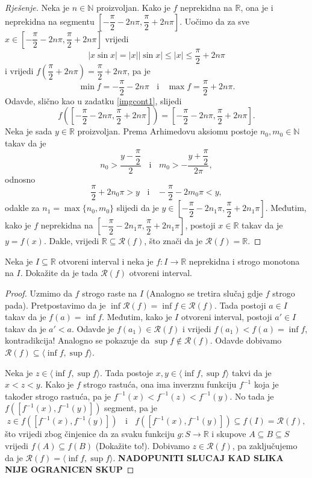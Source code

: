\begin{proof}[Rješenje]
Neka je $n\in \mathbb{N}$ proizvoljan. Kako je $f$ neprekidna na $\mathbb{R}$, ona je i neprekidna na segmentu $\left[-\dfrac{\pi}{2}-2n\pi, \dfrac{\pi}{2}+2n\pi\right]$. Uočimo da za sve $x\in \left[-\dfrac{\pi}{2}-2n\pi, \dfrac{\pi}{2}+2n\pi\right]$ vrijedi 
$$|x\sin{x}|=|x||\sin{x}|\leq |x|\leq \dfrac{\pi}{2}+2n\pi$$
i vrijedi $f\left(\dfrac{\pi}{2}+2n\pi\right)=\dfrac{\pi}{2}+2n\pi$, pa je $$\min{f}=-\dfrac{\pi}{2}-2n\pi\;\;\text{ i }\;\;\max{f}=\dfrac{\pi}{2}+2n\pi.$$
Odavde, slično kao u zadatku \ref{imgcont1}, slijedi $$f\left(\left[-\dfrac{\pi}{2}-2n\pi, \dfrac{\pi}{2}+2n\pi\right]\right)=\left[-\dfrac{\pi}{2}-2n\pi, \dfrac{\pi}{2}+2n\pi\right].$$
Neka je sada $y\in \mathbb{R}$ proizvoljan. Prema Arhimedovu aksiomu postoje $n_0, m_0\in \mathbb{N}$ takav da je 
$$n_0>\dfrac{y-\dfrac{\pi}{2}}{2}\;\;\text{ i }\;\; m_0>-\dfrac{y+\dfrac{\pi}{2}}{2\pi},$$
odnosno
$$\dfrac{\pi}{2}+2n_0\pi>y\;\;\text{ i }\;\;-\dfrac{\pi}{2}-2m_0\pi<y,$$
odakle za $n_1=\max\{n_0, m_0\}$ slijedi da je $y\in \left[-\dfrac{\pi}{2}-2n_1\pi, \dfrac{\pi}{2}+2n_1\pi\right]$. Međutim, kako je $f$ neprekidna na $\left[-\dfrac{\pi}{2}-2n_1\pi, \dfrac{\pi}{2}+2n_1\pi\right]$, postoji $x\in \mathbb{R}$ takav da je $y=f(x)$. Dakle, vrijedi $\mathbb{R}\subseteq \mathcal{R}(f)$, što znači da je $\mathcal{R}(f)=\mathbb{R}$.
\end{proof}
\begin{exercise}
Neka je $I\subseteq \mathbb{R}$ otvoreni interval i neka je $f : I\to \mathbb{R}$ neprekidna i strogo monotona na $I$. Dokažite da je tada $\mathcal{R}(f)$ otvoreni interval.
\end{exercise}
\begin{proof}
Uzmimo da $f$ strogo raste na $I$ (Analogno se tretira slučaj gdje $f$ strogo pada). Pretpostavimo da je $\inf{\mathcal{R}(f)}=\inf{f}\in \mathcal{R}(f)$. Tada postoji $a\in I$ takav da je $f(a)=\inf{f}$. Međutim, kako je $I$ otvoreni interval, postoji $a'\in I$ takav da je $a'<a$. Odavde je $f(a_1)\in \mathcal{R}(f)$ i vrijedi $f(a_1)<f(a)=\inf{f}$, kontradikcija! Analogno se pokazuje da $\sup{f}\notin \mathcal{R}(f)$. Odavde dobivamo $\mathcal{R}(f)\subseteq \langle \inf{f}, \sup{f} \rangle$.

Neka je $z\in \langle \inf{f}, \sup{f} \rangle$. Tada postoje $x, y\in \langle \inf{f}, \sup{f} \rangle$ takvi da je $x<z<y$. Kako je $f$ strogo rastuća, ona ima inverznu funkciju $f^{-1}$ koja je također strogo rastuća, pa je $f^{-1}(x)<f^{-1}(z)<f^{-1}(y)$. No tada je $f\left(\left[f^{-1}(x), f^{-1}(y)\right]\right)$ segment, pa je $$z\in f\left(\left[f^{-1}(x), f^{-1}(y)\right]\right)\;\;\text{ i }\;\;f\left(\left[f^{-1}(x), f^{-1}(y)\right]\right)\subseteq f(I)=\mathcal{R}(f),$$
što vrijedi zbog činjenice da za svaku funkciju $g : S\to \mathbb{R}$ i skupove $A\subseteq B\subseteq S$ vrijedi $f(A)\subseteq f(B)$ (Dokažite to!).
Dobivamo $z\in \mathcal{R}(f)$, pa zaključujemo da je $\mathcal{R}(f)=\langle \inf{f}, \sup{f}\rangle$.
\textbf{NADOPUNITI SLUCAJ KAD SLIKA NIJE OGRANICEN SKUP}
\end{proof}
\newpage
